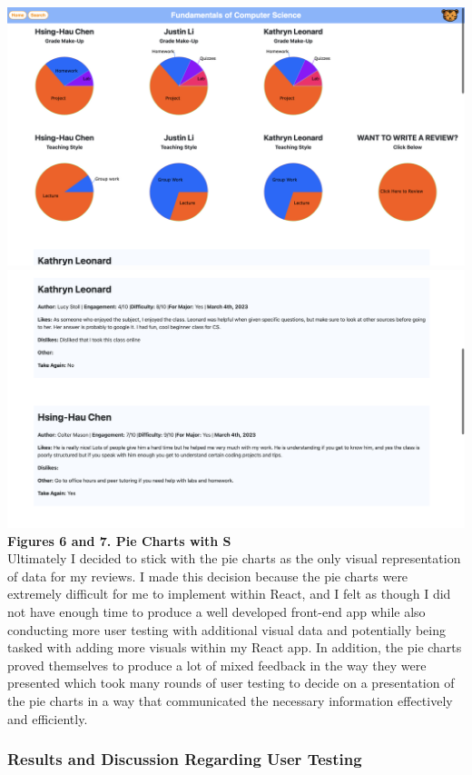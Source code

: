 \documentclass[10pt,twocolumn]{article}
\begin{document}
\includegraphics[scale=.15]{UT6}\\
\includegraphics[scale=.175]{UT7}\\ \textbf{\footnotesize{Figures 6 and 7. Pie Charts with S}}\\

Ultimately I decided to stick with the pie charts as the only visual representation of data for my reviews. I made this decision because the pie charts were extremely difficult for me to implement within React, and I felt as though I did not have enough time to produce a well developed front-end app while also conducting more user testing with additional visual data and potentially being tasked with adding more visuals within my React app. In addition, the pie charts proved themselves to produce a lot of mixed feedback in the way they were presented which took many rounds of user testing to decide on a presentation of the pie charts in a way that communicated the necessary information effectively and efficiently. 

\subsubsection{Results and Discussion Regarding User Testing}
\end{document}

